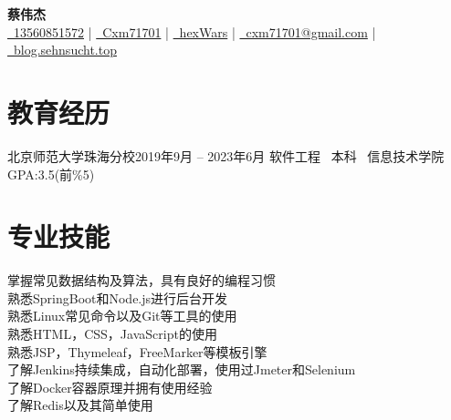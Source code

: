 \documentclass[a4paper]{article}
\begin{document}
\pagestyle{empty}
\setlength{\parindent}{0pt}

{\fontsize{9pt}{7pt}\selectfont


\begin{center}
    \textbf{\Huge 蔡伟杰} \\ 
    \vspace{5pt} %
    \hspace{10pt}
    \href{tel:+8613560851572}{\faPhoneVolume \ 13560851572} | 
    \href{weixin:Cxm71701}{\faWeixin \ Cxm71701} | 
    \href{https://github.com/hexWars}{\faGithub \ hexWars}  | 
    \href{mailto:cxm71701@gmail.com}{\faEnvelope \ cxm71701@gmail.com} | 
    \href{https://blog.sehnsucht.top/}{\faRss \ blog.sehnsucht.top}
    \vspace{-5pt}
\end{center}


\ignorespaces
\section{\textbf{教育经历}}
    \resumeTable
    {北京师范大学珠海分校}{2019年9月 -- 2023年6月}
    {软件工程 \ 本科 \ 信息技术学院}{GPA:3.5(前\%5)}


    



\section{\textbf{专业技能}}

    \textbullet 掌握常见数据结构及算法，具有良好的编程习惯 \\
    \textbullet 熟悉SpringBoot和Node.js进行后台开发 \\
    \textbullet 熟悉Linux常见命令以及Git等工具的使用 \\
    \textbullet 熟悉HTML，CSS，JavaScript的使用 \\
    \textbullet 熟悉JSP，Thymeleaf，FreeMarker等模板引擎 \\
    \textbullet 了解Jenkins持续集成，自动化部署，使用过Jmeter和Selenium \\
    \textbullet 了解Docker容器原理并拥有使用经验 \\
    \textbullet 了解Redis以及其简单使用 \\

}
\end{document}
